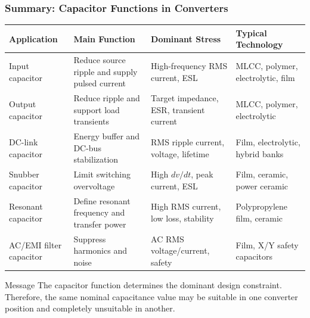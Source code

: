 \begin{frame}
\frametitle{Summary: Capacitor Functions in Converters}

\scriptsize
\begin{table}
\centering
\begin{tabular}{p{}p{}p{}p{}}
\hline
\textbf{Application} & \textbf{Main Function} & \textbf{Dominant Stress} & \textbf{Typical Technology}\\
\hline
Input capacitor &
Reduce source ripple and supply pulsed current &
High-frequency RMS current, ESL &
MLCC, polymer, electrolytic, film\\

Output capacitor &
Reduce ripple and support load transients &
Target impedance, ESR, transient current &
MLCC, polymer, electrolytic\\

DC-link capacitor &
Energy buffer and DC-bus stabilization &
RMS ripple current, voltage, lifetime &
Film, electrolytic, hybrid banks\\

Snubber capacitor &
Limit switching overvoltage &
High \(dv/dt\), peak current, ESL &
Film, ceramic, power ceramic\\

Resonant capacitor &
Define resonant frequency and transfer power &
High RMS current, low loss, stability &
Polypropylene film, ceramic\\

AC/EMI filter capacitor &
Suppress harmonics and noise &
AC RMS voltage/current, safety &
Film, X/Y safety capacitors\\
\hline
\end{tabular}
\end{table}

\vspace{0.15cm}

\begin{block}{Message}
\small
The capacitor function determines the dominant design constraint. Therefore, the same nominal capacitance value may be suitable in one converter position and completely unsuitable in another.
\end{block}

\end{frame}


